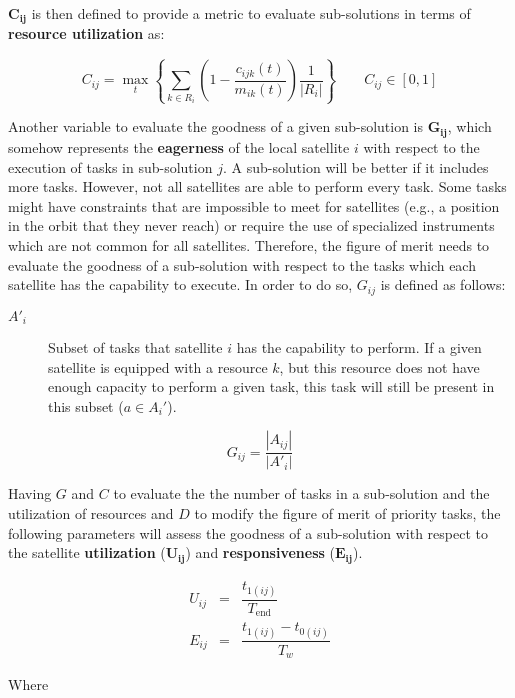 $\mathbf{C_{ij}}$ is then defined to provide a metric to evaluate sub-solutions in terms of \textbf{resource utilization} as:

\begin{equation}
C_{ij} = \max_{t}\left\lbrace \sum_{k \in R_i}\left(1-\dfrac{c_{ijk}(t)}{m_{ik}(t)}\right)\dfrac{1}{|R_i|}\right\rbrace \qquad C_{ij} \in \left[0,1\right]
\end{equation}

Another variable to evaluate the goodness of a given sub-solution is $\mathbf{G_{ij}}$, which somehow represents the \textbf{eagerness} of the local satellite $i$ with respect to the execution of tasks in sub-solution $j$. A sub-solution will be better if it includes more tasks. However, not all satellites are able to perform every task. Some tasks might have constraints that are impossible to meet for satellites (e.g., a position in the orbit that they never reach) or require the use of specialized instruments which are not common for all satellites. Therefore, the figure of merit needs to evaluate the goodness of a sub-solution with respect to the tasks which each satellite has the capability to execute. In order to do so, $G_{ij}$ is defined as follows:
\begin{description}
\item[$A'_i$] Subset of tasks that satellite $i$ has the capability to perform. If a given satellite is equipped with a resource $k$, but this resource does not have enough capacity to perform a given task, this task will still be present in this subset ($a \in A_i'$).
\end{description}

\begin{equation}
G_{ij} = \dfrac{|A_{ij}|}{|A'_i|}
\end{equation}

Having $G$ and $C$ to evaluate the the number of tasks in a sub-solution and the utilization of resources and $D$ to modify the figure of merit of priority tasks, the following parameters will assess the goodness of a sub-solution with respect to the satellite \textbf{utilization} ($\mathbf{U_{ij}}$) and \textbf{responsiveness} ($\mathbf{E_{ij}}$). 

\begin{eqnarray}
U_{ij} &=& \dfrac{t_{1(ij)}}{T_\text{end}}\\
E_{ij} &=& \dfrac{t_{1(ij)}-t_{0(ij)}}{T_w}
\end{eqnarray}

Where

